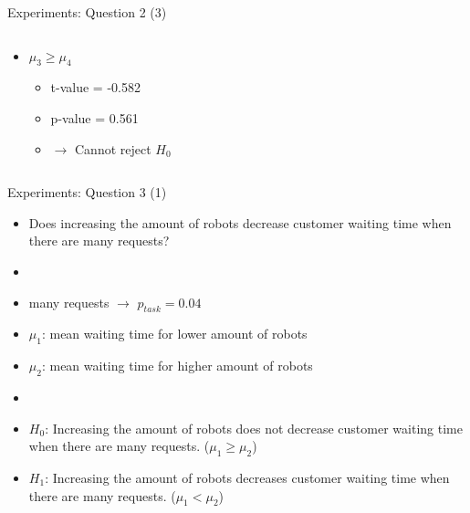\begin{frame}{Experiments: Question 2 (3)}
\begin{columns}
\begin{column}{0.5\textwidth}
\begin{itemize}
                \item $\mu_3 \geq \mu_4$
                    \begin{itemize}
                        \item t-value = -0.582
                        \item p-value = 0.561
                        \item $\rightarrow$ Cannot reject $H_0$
                    \end{itemize}
            \end{itemize}
        \end{column}

    \end{columns}
\end{frame}



\begin{frame}{Experiments: Question 3 (1)}
    \begin{itemize}
        \item Does increasing the amount of robots decrease customer waiting time when there are many requests?
        \item[]
        \item many requests $\rightarrow$ $p_{task} = 0.04$
        \item $\mu_1$: mean waiting time for lower amount of robots
        \item $\mu_2$: mean waiting time for higher amount of robots
        \item[]
        \item $H_0$: Increasing the amount of robots does not decrease customer waiting time when there are many requests. ($\mu_1 \geq \mu_2$)
        \item $H_1$: Increasing the amount of robots decreases customer waiting time when there are many requests. ($\mu_1 < \mu_2$)
    \end{itemize}
\end{frame}

